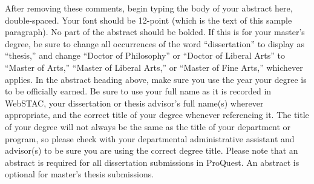 \documentclass{newwuthesis}
\begin{document}
\frontmatter
\thetitlepage               %


\SingleSpacing*
{}
\tableofcontents*                   %
\listoffigures                      %
\listoftables                       %

\DoubleSpacing

\begin{thesisabstract}
After removing these comments, begin typing the body of your abstract here, double-spaced.  Your
font should be 12-point (which is the text of this sample paragraph). No part of the abstract
should be bolded. If this is for your master's degree, be sure to change all occurrences of the word
``dissertation'' to display as ``thesis,'' and change ``Doctor of Philosophy'' or ``Doctor of
Liberal Arts'' to ``Master of Arts,'' ``Master of Liberal Arts,'' or ``Master of Fine Arts,''
whichever applies.  In the abstract heading above, make sure you use the year your degree is to be
officially earned. Be sure to use your full name as it is recorded in WebSTAC, your dissertation or
thesis advisor's full name(s) wherever appropriate, and the correct title of your degree whenever
referencing it.  The title of your degree will not always be the same as the title of your
department or program, so please check with your departmental administrative assistant and
advisor(s) to be sure you are using the correct degree title.  Please note that an abstract is
required for all dissertation submissions in ProQuest. An abstract is optional for master's thesis
submissions.
\end{thesisabstract}

\mainmatter
\pagestyle{main}



\end{document}
